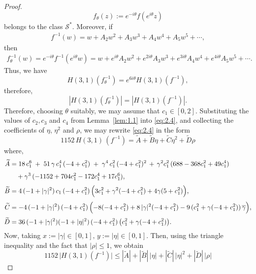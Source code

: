 \documentclass[a4paper,12pt,reqno]{amsart}
\numberwithin{equation}{section}
\begin{document}
\begin{proof}
		\[
		f_{\theta}(z):=e^{-i\theta}f(e^{i\theta}z)
		\]
		belongs to the class $\mathcal{S}^*.$ Moreover, if
		\begin{align*}
		f^{-1}(w)=w+A_{2}w^{2}+A_{3}w^{3}+A_{4}w^{4}+A_{5}w^{5}+\cdots,
		\end{align*}
		then
		\begin{align*}
		f_{\theta}^{-1}(w)=e^{-i\theta}f^{-1}(e^{i\theta}w)
		= w+e^{i\theta}A_{2}w^{2}+e^{2i\theta}A_{3}w^{3}+e^{3i\theta}A_{4}w^{4}
		+e^{4i\theta}A_{5}w^{5}+\cdots .
		\end{align*}
		Thus, we have 
		\[
		H(3,1)(f_{\theta}^{-1})=e^{6i\theta}H(3,1)(f^{-1}),
		\]
	 therefore, 
		\[
		|H(3,1)(f_{\theta}^{-1})|=|H(3,1)(f^{-1})|.
		\]
		Therefore, choosing $\theta$ suitably, we may assume that $c_{1}\in[0,2]$. Substituting the values of $c_2,c_3$ and $c_4$
		from Lemma~\ref{lem:1.1} into \eqref{eq:2.4}, and collecting
		the coefficients of $\eta$, $\eta^2$ and $\rho$, we may rewrite \eqref{eq:2.4} in the form
		\begin{equation}\label{eq:2.5}
			1152\, H(3, 1)\,(f^{-1})=\widetilde{A}+ \widetilde{B} \eta + \widetilde{C} \eta^2+ \widetilde{D}\rho
		\end{equation}
		where,
		\begin{align*}
			\widetilde{A}&=18\,c_{1}^{6}
			\;+\;
			51\,\gamma\,c_{1}^{4}\,(-4 + c_{1}^{2})
			\;+\;
			\gamma^{4}\,c_{1}^{2}\,(-4 + c_{1}^{2})^{2}
			\,+\,
			\gamma^{2}c_{1}^{2}\,(688 - 368c_{1}^{2} + 49c_{1}^{4})
			\;\\[3pt]
			&\quad+\gamma^{3}\,(-1152 + 704c_{1}^{2} - 172c_{1}^{4} + 17c_{1}^{6}), \\[3pt]
			\widetilde{B}&=4\,(-1 + |\gamma|^{2})\,c_{1}\,(-4 + c_{1}^{2})\,
			\Big( 3c_{1}^{2} + \gamma^{2}(-4 + c_{1}^{2}) + 4\gamma(5 + c_{1}^{2}) \Big),\\[3pt]
			\widetilde{C}&=-4\,(-1 + |\gamma|^{2})\,(-4 + c_{1}^{2})\,
			\Bigl(
			-8(-4 + c_{1}^{2})
			+ 8\,|\gamma|^{2}(-4 + c_{1}^{2})
			- 9\,(c_{1}^{2} + \gamma(-4 + c_{1}^{2}))\,\overline{\gamma}
			\Bigr),\\[2pt]
			\widetilde{D}&=36\,(-1 + |\gamma|^{2})(-1 + |\eta|^{2})\,(-4 + c_{1}^{2})\,
			\bigl(c_{1}^{2} + \gamma(-4 + c_{1}^{2})\bigr).
		\end{align*}
		Now, taking
		$
		x:=|\gamma|\in[0,1],\, y:=|\eta|\in[0,1].
		$
		Then, using the triangle inequality and the fact that $|\rho|\le 1$, we obtain
		\[
		1152\,\bigl|H(3,1)(f^{-1})\bigr|
		\le |\widetilde{A}|+|\widetilde{B}|\,|\eta|+|\widetilde{C}|\,|\eta|^{2}+|\widetilde{D}|\,|\rho|
\]
\end{proof}
\end{document}
